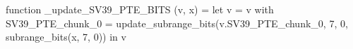 function _update_SV39_PTE_BITS (v, x) = let v = { v with SV39_PTE_chunk_0 = update_subrange_bits(v.SV39_PTE_chunk_0, 7, 0, subrange_bits(x, 7, 0)) } in
  v

